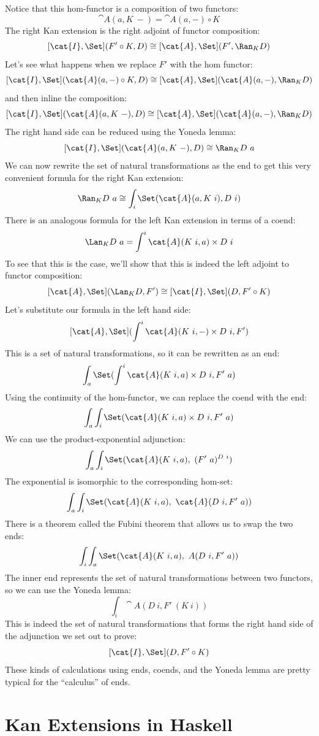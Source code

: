 \noindent
Notice that this hom-functor is a composition of two functors:
\[\cat{A}(a, K\ -) = \cat{A}(a, -) \circ K\]
The right Kan extension is the right adjoint of functor composition:
\[[\cat{I}, \Set](F' \circ K, D) \cong [\cat{A}, \Set](F', \Ran_{K}D)\]
Let's see what happens when we replace $F'$ with the hom
functor:
\[[\cat{I}, \Set](\cat{A}(a, -) \circ K, D) \cong [\cat{A}, \Set](\cat{A}(a, -), \Ran_{K}D)\]
and then inline the composition:
\[[\cat{I}, \Set](\cat{A}(a, K\ -), D) \cong [\cat{A}, \Set](\cat{A}(a, -), \Ran_{K}D)\]
The right hand side can be reduced using the Yoneda lemma:
\[[\cat{I}, \Set](\cat{A}(a, K\ -), D) \cong \Ran_{K}D\ a\]
We can now rewrite the set of natural transformations as the end to get
this very convenient formula for the right Kan extension:
\[\Ran_{K}D\ a \cong \int_i \Set(\cat{A}(a, K\ i), D\ i)\]
There is an analogous formula for the left Kan extension in terms of a
coend:
\[\Lan_{K}D\ a = \int^i \cat{A}(K\ i, a)\times{}D\ i\]
To see that this is the case, we'll show that this is indeed the left
adjoint to functor composition:
\[[\cat{A}, \Set](\Lan_{K}D, F') \cong [\cat{I}, \Set](D, F' \circ K)\]
Let's substitute our formula in the left hand side:
\[[\cat{A}, \Set](\int^i \cat{A}(K\ i, -)\times{}D\ i, F')\]
This is a set of natural transformations, so it can be rewritten as an
end:
\[\int_a \Set(\int^i \cat{A}(K\ i, a)\times{}D\ i, F'\ a)\]
Using the continuity of the hom-functor, we can replace the coend with
the end:
\[\int_a \int_i \Set(\cat{A}(K\ i, a)\times{}D\ i, F'\ a)\]
We can use the product-exponential adjunction:
\[\int_a \int_i \Set(\cat{A}(K\ i, a),\ (F'\ a)^{D\ i})\]
The exponential is isomorphic to the corresponding hom-set:
\[\int_a \int_i \Set(\cat{A}(K\ i, a),\ \cat{A}(D\ i, F'\ a))\]
There is a theorem called the Fubini theorem that allows us to swap the
two ends:
\[\int_i \int_a \Set(\cat{A}(K\ i, a),\ A(D\ i, F'\ a))\]
The inner end represents the set of natural transformations between two
functors, so we can use the Yoneda lemma:
\[\int_i \cat{A}(D\ i, F'\ (K\ i))\]
This is indeed the set of natural transformations that forms the right
hand side of the adjunction we set out to prove:
\[[\cat{I}, \Set](D, F' \circ K)\]
These kinds of calculations using ends, coends, and the Yoneda lemma are
pretty typical for the ``calculus'' of ends.

\section{Kan Extensions in Haskell}

